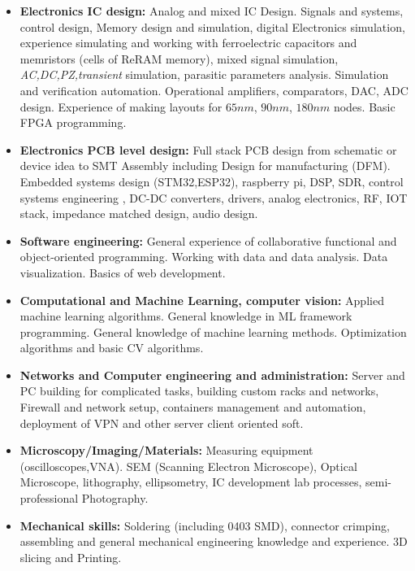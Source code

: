 \documentclass{article}
\begin{document}
\begin{itemize}

\item \textbf{Electronics IC design:} Analog and mixed IC Design. Signals and systems, control design, Memory design and simulation, digital Electronics simulation, experience simulating and working with ferroelectric capacitors and memristors (cells of ReRAM memory),   mixed signal simulation, \textit{AC,DC,PZ,transient} simulation, parasitic parameters analysis. Simulation and verification automation. Operational amplifiers, comparators, DAC, ADC design. Experience of making layouts for $65 nm$, $90nm$, $180nm$ nodes. Basic FPGA programming.
\item \textbf{Electronics PCB level design:} Full stack PCB design from schematic or device idea to SMT Assembly including Design for manufacturing (DFM). Embedded systems design (STM32,ESP32), raspberry pi, DSP, SDR,  control systems engineering , DC-DC converters, drivers, analog electronics, RF, IOT stack, impedance matched design, audio design.
\item \textbf{Software engineering:} General experience of collaborative functional and object-oriented programming. Working with data and data analysis. Data visualization. Basics of web development.
\item \textbf{Computational and Machine Learning, computer vision:} Applied machine learning algorithms. General knowledge in ML framework programming. General knowledge of machine learning methods. Optimization algorithms and basic CV algorithms.
\item \textbf{Networks and Computer engineering and administration:} Server and PC building for complicated tasks, building custom racks and networks, Firewall and network setup, containers management and automation, deployment of VPN and other server client oriented soft.
\item \textbf{Microscopy/Imaging/Materials:} Measuring equipment (oscilloscopes,VNA). SEM (Scanning Electron Microscope), Optical Microscope, lithography, ellipsometry, IC development lab processes, semi-professional Photography.
\item \textbf{Mechanical skills:} Soldering (including 0403 SMD), connector crimping,  assembling and general mechanical engineering knowledge and experience. 3D slicing and Printing.
\end{itemize}
 
\end{document}

